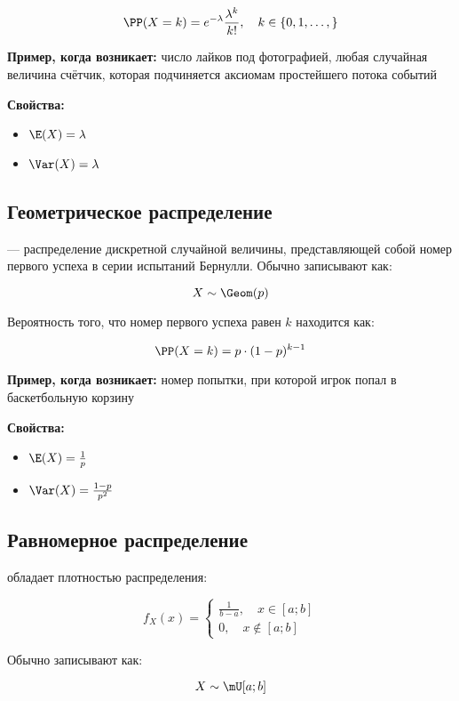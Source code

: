 $$
\PP(X = k) = e^{-\lambda} \dfrac{\lambda^k}{k!}, \quad k \in \{0, 1, \ldots, \}
$$

\textbf{Пример, когда возникает:} число лайков под фотографией, любая случайная величина счётчик, которая подчиняется аксиомам простейшего потока событий

\textbf{Свойства:}

\begin{itemize} 
\item $\E(X) = \lambda$
\item $\Var(X) = \lambda$
\end{itemize} 

\subsection*{Геометрическое распределение}

 --- распределение дискретной случайной величины, представляющей собой номер первого успеха в серии испытаний Бернулли. Обычно записывают как:

$$
X \sim \Geom(p)
$$

Вероятность того, что номер первого успеха равен $k$ находится как:

$$
\PP(X = k) = p \cdot (1 - p)^{k - 1}
$$

\textbf{Пример, когда возникает:} номер попытки, при которой игрок попал в баскетбольную корзину

\textbf{Свойства:}

\begin{itemize} 
\item $\E(X) = \frac{1}{p}$
\item $\Var(X) = \frac{1-p}{p^2}$
\end{itemize} 


\subsection*{Равномерное распределение}

 обладает плотностью распределения: 

$$
f_X(x) =\begin{cases}
\frac{1}{b - a}, \quad x \in [a; b]  \\
0, \quad x \notin [a; b]
\end{cases}
$$

Обычно записывают как:

$$
X \sim \mU[a; b]
$$

